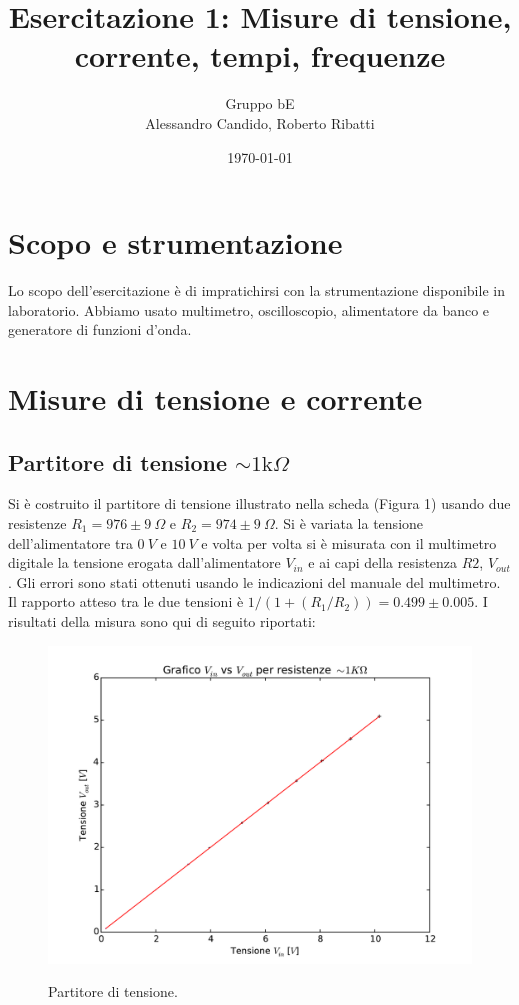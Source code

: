 \documentclass[10pt,a4paper]{article}
\title{Esercitazione 1: Misure di tensione, corrente, tempi, frequenze}
\author{Gruppo bE \\ Alessandro Candido, Roberto Ribatti}
\date{\today}
\begin{document}
\maketitle

\section{Scopo e strumentazione}
Lo scopo dell'esercitazione è di impratichirsi con la strumentazione disponibile in laboratorio. Abbiamo usato multimetro, oscilloscopio, alimentatore da banco e generatore di funzioni d'onda.

\section{Misure di tensione e corrente}

\subsection{Partitore di tensione $\sim1\text{k}\Omega$}
Si è costruito il partitore di tensione illustrato nella scheda (Figura 1) usando due resistenze $R_1 = 976 \pm 9~\Omega$ e $R_2 = 974 \pm 9 ~\Omega$.
Si è variata la tensione dell'alimentatore tra $0~V$ e $10~V$ e volta per volta si è misurata con il multimetro digitale la tensione erogata dall'alimentatore $V_{in}$ e ai capi della resistenza $R2$, $V_{out}$. Gli errori sono stati ottenuti usando le indicazioni del manuale del multimetro.
Il rapporto atteso tra le due tensioni è $1/(1+(R_1/R_2))=0.499 \pm 0.005$. 
I risultati della misura sono qui di seguito riportati:

\begin{figure}[h]
\centering
\begin{minipage}[b]{.6\textwidth}
	\centering
	\includegraphics[scale=.5\textwidthwidth]{../grafici/fit_1KOhm.pdf}
	\caption{Partitore di tensione.}
	\label{f:par1}
\end{minipage}\hfill
\begin{minipage}[b]{.35\textwidth}
	\centering
	
	\label{...}
\end{minipage}\hspace*{\fill}
\end{figure}
\end{document}
